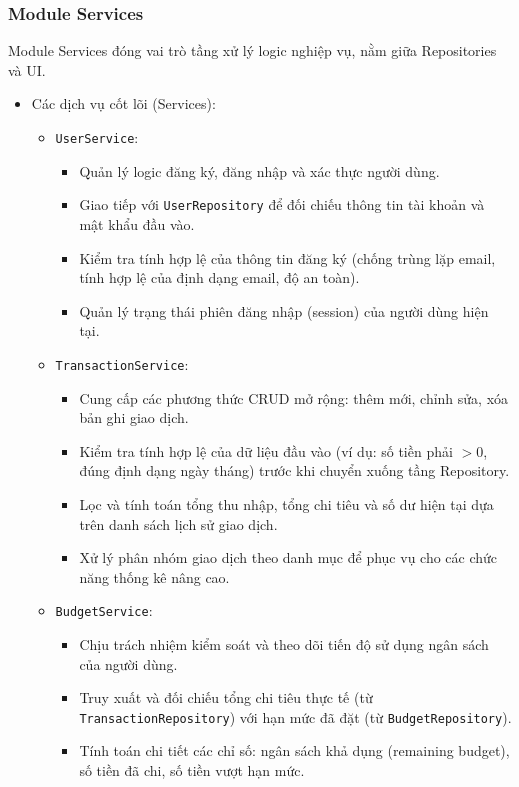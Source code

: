 \documentclass[12pt,letterpaper]{article}
\begin{document}
\subsubsection{Module Services}
Module Services đóng vai trò tầng xử lý logic nghiệp vụ, nằm giữa Repositories và UI.
\begin{itemize}
    \item Các dịch vụ cốt lõi (Services):
    \begin{itemize}
        \item \texttt{UserService}:
        \begin{itemize}
            \item Quản lý logic đăng ký, đăng nhập và xác thực người dùng.
            \item Giao tiếp với \texttt{UserRepository} để đối chiếu thông tin tài khoản và mật khẩu đầu vào.
            \item Kiểm tra tính hợp lệ của thông tin đăng ký (chống trùng lặp email, tính hợp lệ của định dạng email, độ an toàn).
            \item Quản lý trạng thái phiên đăng nhập (session) của người dùng hiện tại.
        \end{itemize}
        \item \texttt{TransactionService}:
        \begin{itemize}
            \item Cung cấp các phương thức CRUD mở rộng: thêm mới, chỉnh sửa, xóa bản ghi giao dịch.
            \item Kiểm tra tính hợp lệ của dữ liệu đầu vào (ví dụ: số tiền phải $> 0$, đúng định dạng ngày tháng) trước khi chuyển xuống tầng Repository.
            \item Lọc và tính toán tổng thu nhập, tổng chi tiêu và số dư hiện tại dựa trên danh sách lịch sử giao dịch.
            \item Xử lý phân nhóm giao dịch theo danh mục để phục vụ cho các chức năng thống kê nâng cao.
        \end{itemize}
        \item \texttt{BudgetService}:
        \begin{itemize}
            \item Chịu trách nhiệm kiểm soát và theo dõi tiến độ sử dụng ngân sách của người dùng.
            \item Truy xuất và đối chiếu tổng chi tiêu thực tế (từ \texttt{TransactionRepository}) với hạn mức đã đặt (từ \texttt{BudgetRepository}).
            \item Tính toán chi tiết các chỉ số: ngân sách khả dụng (remaining budget), số tiền đã chi, số tiền vượt hạn mức.

\end{itemize}
\end{itemize}
\end{itemize}
\end{document}
